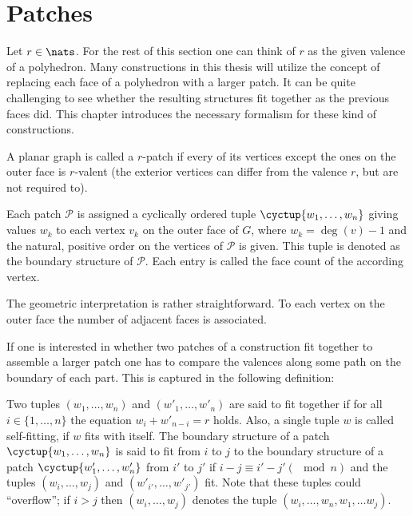 \section{Patches}

Let $r \in \nats$. For the rest of this section one can think of $r$ as the given valence of a polyhedron. Many constructions in this thesis will utilize the concept of replacing each face of a polyhedron with a larger patch. It can be quite challenging to see whether the resulting structures fit together as the previous faces did. This chapter introduces the necessary formalism for these kind of constructions.

\begin{definition}[Patch] A planar graph is called a $r$-patch if every of its vertices except the ones on the outer face is $r$-valent (the exterior vertices can differ from the valence $r$, but are not required to). 
\end{definition}

\begin{definition} Each patch $\mathcal{P}$ is assigned a cyclically ordered tuple $\cyctup{w_1, \dots, w_n}$ giving values $w_k$ to each vertex $v_k$ on the outer face of $G$, where $w_k = \deg(v) - 1$ and the natural, positive order on the vertices of $\mathcal{P}$ is given. This tuple is denoted as the boundary structure of $\mathcal{P}$. Each entry is called the face count of the according vertex.
\end{definition}

The geometric interpretation is rather straightforward. To each vertex on the outer face the number of adjacent faces is associated.

If one is interested in whether two patches of a construction fit together to assemble a larger patch one has to compare the valences along some path on the boundary of each part. This is captured in the following definition:
\begin{definition}
  Two tuples $(w_1, \dots, w_n)$ and $(w'_1, \dots, w'_n)$ are said to fit together if for all $i \in \{1, \dots, n \}$ the equation $w_i + w'_{n-i} = r$ holds. Also, a single tuple $w$ is called self-fitting, if $w$ fits with itself. The boundary structure of a patch $\cyctup{w_1, \dots, w_n}$ is said to fit from $i$ to $j$ to the boundary structure of a patch $\cyctup{w'_1, \dots, w'_n}$ from $i'$ to $j'$ if $i-j \equiv i' -j' (\mod n)$ and the tuples $(w_i, \dots, w_j)$ and $(w'_{i'}, \dots, w'_{j'})$ fit. Note that these tuples could ``overflow''; if $i > j$ then $(w_i, \dots, w_j)$ denotes the tuple $(w_i, \dots, w_n, w_1, \dots w_j)$.
\end{definition}


